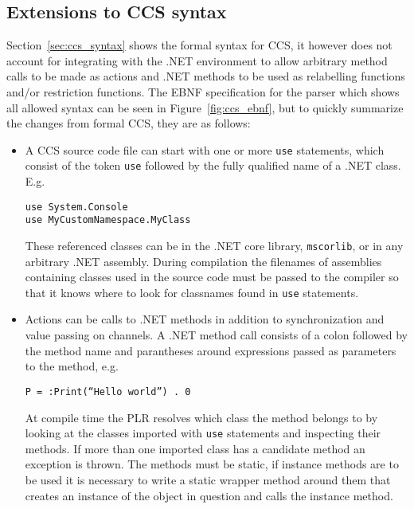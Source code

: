 \subsection{Extensions to CCS syntax}

	Section~\ref{sec:ccs_syntax} shows the formal syntax for CCS, it however 
	does not account for integrating with the .NET environment to allow 
	arbitrary method calls to be made as actions and .NET methods to be used as 
	relabelling functions and/or restriction functions. The EBNF specification 
	for the parser which shows all allowed syntax can be seen in 
	Figure~\ref{fig:ccs_ebnf}, but to quickly summarize the changes from formal 
	CCS, they are as follows:
	
	\begin{itemize}
		
		\item A CCS source code file can start with one or more \texttt{use} 
		statements, which consist of the token \texttt{use} followed by the fully 
		qualified name of a .NET class. E.g.
		
		\begin{center}\texttt{use System.Console\ \ \ \ \ \ \ \ \ \ \ \ \\\texttt{use MyCustomNamespace.MyClass}}\end{center}
		
		These referenced classes can be in the .NET core library, 
		\texttt{mscorlib}, or in any arbitrary .NET assembly. During compilation 
		the filenames of assemblies containing classes used in the source code 
		must be passed to the compiler so that it knows where to look for 
		classnames found in \texttt{use} statements.
	
		\item Actions can be calls to .NET methods in addition to synchronization 
		and value passing on channels. A .NET method call consists of a colon 
		followed by the method name and parantheses around expressions passed as 
		parameters to the method, e.g. 
		
		\begin{center}\texttt{P = :Print(``Hello world'') . 0}\end{center}
		
		At compile time the PLR resolves which class the method belongs to by 
		looking at the classes imported with \texttt{use} statements and 
		inspecting their methods. If more than one imported class has a candidate 
		method an exception is thrown. The methods must be static, if instance 
		methods are to be used it is necessary to write a static wrapper method 
		around them that creates an instance of the object in question and calls 
		the instance method.
		

\end{itemize}
